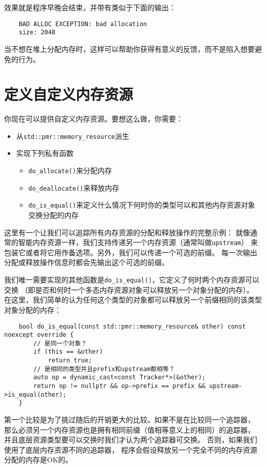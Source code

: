 效果就是程序早晚会结束，并带有类似于下面的输出：
\begin{lstlisting}
    BAD ALLOC EXCEPTION: bad allocation
    size: 2048
\end{lstlisting}
当不想在堆上分配内存时，这样可以帮助你获得有意义的反馈，而不是陷入想要避免的行为。


\section{定义自定义内存资源}\label{ch29.2}
你现在可以提供自定义内存资源。要想这么做，你需要：
\begin{itemize}
    \item 从\texttt{std::pmr::memory\_resource}派生
    \item 实现下列私有函数
    \begin{itemize}
        \item \texttt{do\_allocate()}来分配内存
        \item \texttt{do\_deallocate()}来释放内存
        \item \texttt{do\_is\_equal()}来定义什么情况下何时你的类型可以和其他内存资源对象交换分配的内存
    \end{itemize}
\end{itemize}
这里有一个让我们可以追踪所有内存资源的分配和释放操作的完整示例：
就像通常的智能内存资源一样，我们支持传递另一个内存资源（通常叫做\texttt{upstream}）
来包装它或者将它用作备选项。另外，我们可以传递一个可选的前缀。
每一次输出分配或释放操作信息时都会先输出这个可选的前缀。

我们唯一需要实现的其他函数是\texttt{do\_is\_equal()}，它定义了何时两个内存资源可以交换
（即是否和何时一个多态内存资源对象可以释放另一个对象分配的内存）。
在这里，我们简单的认为任何这个类型的对象都可以释放另一个前缀相同的该类型对象分配的内存：
\begin{lstlisting}
    bool do_is_equal(const std::pmr::memory_resource& other) const noexcept override {
        // 是同一个对象？
        if (this == &other)
            return true;
        // 是相同的类型并且prefix和upstream都相等？
        auto op = dynamic_cast<const Tracker*>(&other);
        return op != nullptr && op->prefix == prefix && upstream->is_equal(other);
    }
\end{lstlisting}
第一个比较是为了挑过随后的开销更大的比较。如果不是在比较同一个追踪器，
那么必须另一个内存资源也是拥有相同前缀（值相等意义上的相同）的追踪器，
并且底层资源类型要可以交换时我们才认为两个追踪器可交换。
否则，如果我们使用了底层内存资源不同的追踪器，
程序会假设释放另一个完全不同的内存资源分配的内存是OK的。

